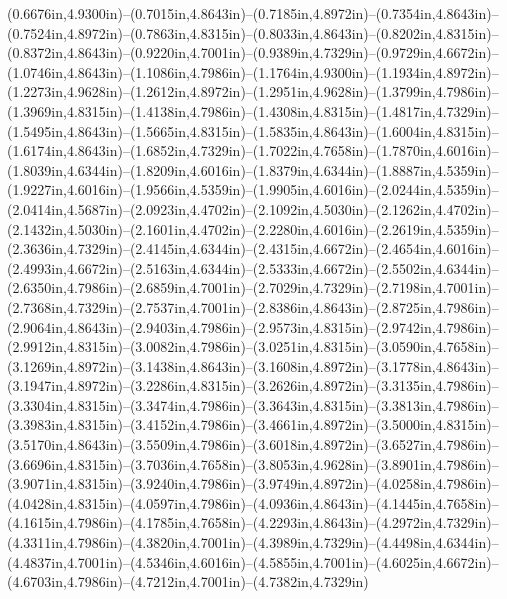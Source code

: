 (0.6676in,4.9300in)--(0.7015in,4.8643in)--(0.7185in,4.8972in)--(0.7354in,4.8643in)--(0.7524in,4.8972in)--(0.7863in,4.8315in)--(0.8033in,4.8643in)--(0.8202in,4.8315in)--(0.8372in,4.8643in)--(0.9220in,4.7001in)--(0.9389in,4.7329in)--(0.9729in,4.6672in)--(1.0746in,4.8643in)--(1.1086in,4.7986in)--(1.1764in,4.9300in)--(1.1934in,4.8972in)--(1.2273in,4.9628in)--(1.2612in,4.8972in)--(1.2951in,4.9628in)--(1.3799in,4.7986in)--(1.3969in,4.8315in)--(1.4138in,4.7986in)--(1.4308in,4.8315in)--(1.4817in,4.7329in)--(1.5495in,4.8643in)--(1.5665in,4.8315in)--(1.5835in,4.8643in)--(1.6004in,4.8315in)--(1.6174in,4.8643in)--(1.6852in,4.7329in)--(1.7022in,4.7658in)--(1.7870in,4.6016in)--(1.8039in,4.6344in)--(1.8209in,4.6016in)--(1.8379in,4.6344in)--(1.8887in,4.5359in)--(1.9227in,4.6016in)--(1.9566in,4.5359in)--(1.9905in,4.6016in)--(2.0244in,4.5359in)--(2.0414in,4.5687in)--(2.0923in,4.4702in)--(2.1092in,4.5030in)--(2.1262in,4.4702in)--(2.1432in,4.5030in)--(2.1601in,4.4702in)--(2.2280in,4.6016in)--(2.2619in,4.5359in)--(2.3636in,4.7329in)--(2.4145in,4.6344in)--(2.4315in,4.6672in)--(2.4654in,4.6016in)--(2.4993in,4.6672in)--(2.5163in,4.6344in)--(2.5333in,4.6672in)--(2.5502in,4.6344in)--(2.6350in,4.7986in)--(2.6859in,4.7001in)--(2.7029in,4.7329in)--(2.7198in,4.7001in)--(2.7368in,4.7329in)--(2.7537in,4.7001in)--(2.8386in,4.8643in)--(2.8725in,4.7986in)--(2.9064in,4.8643in)--(2.9403in,4.7986in)--(2.9573in,4.8315in)--(2.9742in,4.7986in)--(2.9912in,4.8315in)--(3.0082in,4.7986in)--(3.0251in,4.8315in)--(3.0590in,4.7658in)--(3.1269in,4.8972in)--(3.1438in,4.8643in)--(3.1608in,4.8972in)--(3.1778in,4.8643in)--(3.1947in,4.8972in)--(3.2286in,4.8315in)--(3.2626in,4.8972in)--(3.3135in,4.7986in)--(3.3304in,4.8315in)--(3.3474in,4.7986in)--(3.3643in,4.8315in)--(3.3813in,4.7986in)--(3.3983in,4.8315in)--(3.4152in,4.7986in)--(3.4661in,4.8972in)--(3.5000in,4.8315in)--(3.5170in,4.8643in)--(3.5509in,4.7986in)--(3.6018in,4.8972in)--(3.6527in,4.7986in)--(3.6696in,4.8315in)--(3.7036in,4.7658in)--(3.8053in,4.9628in)--(3.8901in,4.7986in)--(3.9071in,4.8315in)--(3.9240in,4.7986in)--(3.9749in,4.8972in)--(4.0258in,4.7986in)--(4.0428in,4.8315in)--(4.0597in,4.7986in)--(4.0936in,4.8643in)--(4.1445in,4.7658in)--(4.1615in,4.7986in)--(4.1785in,4.7658in)--(4.2293in,4.8643in)--(4.2972in,4.7329in)--(4.3311in,4.7986in)--(4.3820in,4.7001in)--(4.3989in,4.7329in)--(4.4498in,4.6344in)--(4.4837in,4.7001in)--(4.5346in,4.6016in)--(4.5855in,4.7001in)--(4.6025in,4.6672in)--(4.6703in,4.7986in)--(4.7212in,4.7001in)--(4.7382in,4.7329in) 